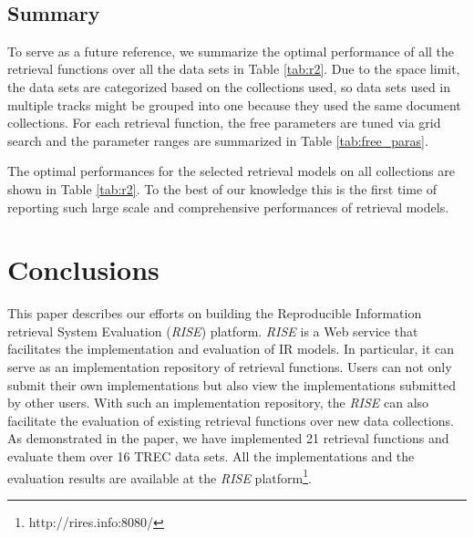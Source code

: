 ~\\

\subsection{Summary}

To serve as a future reference, we summarize the optimal performance of 
all the retrieval functions over all the data sets in Table \ref{tab:r2}. 
Due to the space limit, the data sets are categorized based on the 
collections used, so data sets used in multiple tracks might be 
grouped into one because they used the same document collections. 
For each retrieval function, the free parameters are tuned via 
grid search and the parameter ranges are summarized 
in Table \ref{tab:free_paras}. 

The optimal performances for the selected retrieval models on all  
collections are shown in Table \ref{tab:r2}. To the best of 
our knowledge this is the first time of reporting such large scale 
and comprehensive performances of retrieval models. 


\section{Conclusions}
\label{sec:con}
This paper describes our efforts on building the 
Reproducible Information retrieval System Evaluation ({\em RISE}) 
platform. {\em RISE} is a Web service that facilitates the 
implementation and evaluation of IR models.  In particular, it 
can serve as an implementation repository of retrieval functions. 
Users can not only submit their own implementations but also view 
the implementations submitted by other users. With such an implementation 
repository, the {\em RISE} can also facilitate the evaluation of existing 
retrieval functions over new data collections. As demonstrated in 
the paper, we have implemented 21 retrieval functions and evaluate them 
over 16 TREC data sets. All the implementations and the evaluation 
results are available at the {\em RISE} platform\footnote{http://rires.info:8080/}. 
